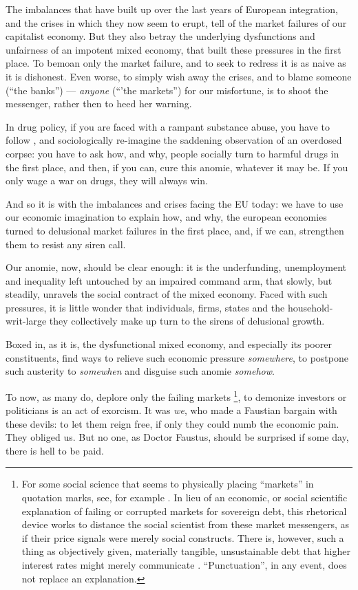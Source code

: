 \documentclass[11pt,a4paper,oneside,openright]{article}
\begin{document}
The imbalances that have built up over the last years of European integration, and the crises in which they now seem to erupt, tell of the market failures of our capitalist economy. 
But they also betray the underlying dysfunctions and unfairness of an impotent mixed economy, that built these pressures in the first place. 
To bemoan only the market failure, and to seek to redress it is as naive as it is dishonest. 
Even worse, to simply wish away the crises, and to blame someone (``the banks'') --- \emph{anyone} (``'the markets'') for our misfortune, is to shoot the messenger, rather then to heed her warning.

In drug policy, if you are faced with a rampant substance abuse, you have to follow \cite{Mills-1959-aa}, and sociologically re-imagine the saddening observation of an overdosed corpse: 
you have to ask how, and why, people socially turn to harmful drugs in the first place, and then, if you can, cure this anomie, whatever it may be. 
If you only wage a war on drugs, they will always win.

And so it is with the imbalances and crises facing the \gls{EU} today: 
we have to use our economic imagination to explain how, and why, the european economies turned to delusional market failures in the first place, and, if we can, strengthen them to resist any siren call. 

Our anomie, now, should be clear enough: 
it is the underfunding, unemployment and inequality left untouched by an impaired command arm, that slowly, but steadily, unravels the social contract of the mixed economy. 
Faced with such pressures, it is little wonder that individuals, firms, states and the household-writ-large they collectively make up turn to the sirens of delusional growth.

Boxed in, as it is, the dysfunctional mixed economy, and especially its poorer constituents, find ways to relieve such economic pressure \emph{somewhere}, to postpone such austerity to \emph{somewhen} and disguise such anomie \emph{somehow}. 

To now, as many do, deplore only the failing markets
\footnote{
	For some social science that seems to physically placing ``markets'' in quotation marks, see, for example \citealt{Beckert2012}. 
	In lieu of an economic, or social scientific explanation of failing or corrupted markets for sovereign debt, this rhetorical device works to distance the social scientist from these market messengers, as if their price signals were merely social constructs. 
	There is, however, such a thing as objectively given, materially tangible, unsustainable debt that higher interest rates might merely communicate \citep[55]{Wihlborg2010}.
	 ``Punctuation'', in any event, does not replace an explanation.
}, 
to demonize investors or politicians is an act of exorcism. 
It was \emph{we}, who made a Faustian bargain with these devils: 
to let them reign free, if only they could numb the economic pain. 
They obliged us. But no one, as Doctor Faustus, should be surprised if some day, there is hell to be paid.
\end{document}
